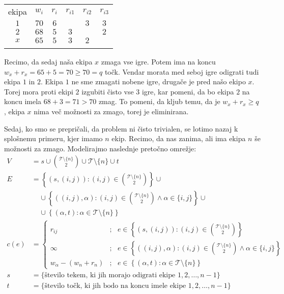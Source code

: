 \documentclass[mat1]{fmfdelo}
\begin{document}
\begin{table}[h!]
\centering
\begin{tabular}{||c||c|c||c|c|c||}
\hhline{|t:======:t|}
ekipa & $w_i$ & $r_i$ & $r_{i1}$ & $r_{i2}$ & $r_{i3}$\\ \hhline{||=||==||===||}
$1$ & $70$ & $6$ & & $3$ & $3$\\ \hhline{||-||--||---||}
$2$ & $68$ & $5$ & $3$ & & $2$\\ \hhline{||-||--||---||}
$x$ & $65$ & $5$ & $3$ & $2$ & \\ \hhline{|b:======:b|}
\end{tabular}
\end{table}

Recimo, da sedaj naša ekipa $x$ zmaga vse igre. Potem ima na koncu $w_x + r_x = 65+5=70 \geq 70 = q$ točk. Vendar morata med seboj igre odigrati tudi ekipa $1$ in $2$. Ekipa $1$ ne sme zmagati nobene igre, drugače je pred našo ekipo $x$. Torej mora proti ekipi $2$ izgubiti čisto vse $3$ igre, kar pomeni, da bo ekipa $2$ na koncu imela $68+3 = 71 > 70$ zmag. To pomeni, da kljub temu, da je $w_x + r_x \geq q$, ekipa $x$ nima več možnosti za zmago, torej je eliminirana.

Sedaj, ko smo se prepričali, da problem ni čisto trivialen, se lotimo nazaj k splošnemu primeru, kjer imamo $n$ ekip. Recimo, da nas zanima, ali ima ekipa $n$ še možnosti za zmago. Modelirajmo naslednje pretočno omrežje:
\begin{align*}
V &= s \cup \binom{\mathcal{T} \setminus \{n\}}{2} \cup \mathcal{T} \setminus \{n\} \cup t\\
E &= \left\{(s,(i,j)) : (i,j) \in \binom{\mathcal{T} \setminus \{n\}}{2}\right\} \cup\\
&~~~~~\cup \left\{((i,j), \alpha) : (i,j) \in \binom{\mathcal{T} \setminus \{n\}}{2} \wedge \alpha \in \{i,j\}\right\} \cup\\
&~~~~~\cup \left\{(\alpha, t) : \alpha \in \mathcal{T} \setminus \{n\}\right\}\\
c(e) &=\begin{cases}
r_{ij} &;~~~ e \in \left\{(s,(i,j)) : (i,j) \in \binom{\mathcal{T} \setminus \{n\}}{2}\right\}\\
\infty &;~~~ e \in \left\{((i,j), \alpha) : (i,j) \in \binom{\mathcal{T} \setminus \{n\}}{2} \wedge \alpha \in \{i,j\}\right\}\\
w_{\alpha} - (w_n + r_n) &;~~~ e \in \left\{(\alpha, t) : \alpha \in \mathcal{T} \setminus \{n\}\right\}
\end{cases}\\
s &= \{\textrm{število tekem, ki jih morajo odigrati ekipe $1,2,\dotsc,n-1$}\}\\
t &= \{\textrm{število točk, ki jih bodo na koncu imele ekipe $1,2,\dotsc, n-1$}\}
\end{align*}
\end{document}
